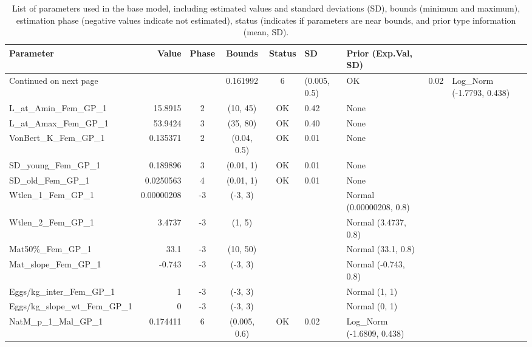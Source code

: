 \documentclass[12pt,]{article}
\begin{document}
\begin{landscape}
\begingroup\fontsize{9pt}{10pt}\selectfont
\begin{longtable}{lrcccll}
\caption{List of parameters used in
                                          the base model, including estimated 
                                          values and standard deviations (SD), 
                                          bounds (minimum and maximum), 
                                          estimation phase (negative values indicate
                                          not estimated), status (indicates if 
                                          parameters are near bounds, and prior type
                                          information (mean, SD).} \\ 
  \hline
Parameter & Value & Phase & Bounds & Status & SD & Prior (Exp.Val, SD)  \\ 
  \hline 
\endhead 
\hline 
\multicolumn{3}{l}{\footnotesize Continued on next page} 
\endfoot 
\endlastfoot 
 \hline
NatM\_p\_1\_Fem\_GP\_1 & 0.161992 & 6 & (0.005, 0.5) & OK & 0.02 & Log\_Norm (-1.7793, 0.438) \\ 
  L\_at\_Amin\_Fem\_GP\_1 & 15.8915 & 2 & (10, 45) & OK & 0.42 & None \\ 
  L\_at\_Amax\_Fem\_GP\_1 & 53.9424 & 3 & (35, 80) & OK & 0.40 & None \\ 
  VonBert\_K\_Fem\_GP\_1 & 0.135371 & 2 & (0.04, 0.5) & OK & 0.01 & None \\ 
  SD\_young\_Fem\_GP\_1 & 0.189896 & 3 & (0.01, 1) & OK & 0.01 & None \\ 
  SD\_old\_Fem\_GP\_1 & 0.0250563 & 4 & (0.01, 1) & OK & 0.01 & None \\ 
  Wtlen\_1\_Fem\_GP\_1 & 0.00000208 & -3 & (-3, 3) &  &  & Normal (0.00000208, 0.8) \\ 
  Wtlen\_2\_Fem\_GP\_1 & 3.4737 & -3 & (1, 5) &  &  & Normal (3.4737, 0.8) \\ 
  Mat50\%\_Fem\_GP\_1 & 33.1 & -3 & (10, 50) &  &  & Normal (33.1, 0.8) \\ 
  Mat\_slope\_Fem\_GP\_1 & -0.743 & -3 & (-3, 3) &  &  & Normal (-0.743, 0.8) \\ 
  Eggs/kg\_inter\_Fem\_GP\_1 & 1 & -3 & (-3, 3) &  &  & Normal (1, 1) \\ 
  Eggs/kg\_slope\_wt\_Fem\_GP\_1 & 0 & -3 & (-3, 3) &  &  & Normal (0, 1) \\ 
  NatM\_p\_1\_Mal\_GP\_1 & 0.174411 & 6 & (0.005, 0.6) & OK & 0.02 & Log\_Norm (-1.6809, 0.438) \\ 

\end{longtable}
\end{landscape}
\end{document}
